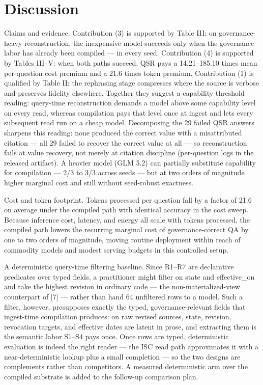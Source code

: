 \documentclass[conference,a4paper]{IEEEtran}
\begin{document}
\section{Discussion}

Claims and evidence. Contribution (3) is supported by Table III: on governance-heavy reconstruction, the inexpensive model succeeds only when the governance labor has already been compiled --- in every seed. Contribution (4) is supported by Tables III--V: when both paths succeed, QSR pays a 14.21--185.10 times mean per-question cost premium and a 21.6 times token premium. Contribution (1) is qualified by Table II: the rephrasing stage compresses where the source is verbose and preserves fidelity elsewhere. Together they suggest a capability-threshold reading: query-time reconstruction demands a model above some capability level on every read, whereas compilation pays that level once at ingest and lets every subsequent read run on a cheap model. Decomposing the 29 failed QSR answers sharpens this reading: none produced the correct value with a misattributed citation --- all 29 failed to recover the correct value at all --- so reconstruction fails at value recovery, not merely at citation discipline (per-question logs in the released artifact). A heavier model (GLM 5.2) can partially substitute capability for compilation --- 2/3 to 3/3 across seeds --- but at two orders of magnitude higher marginal cost and still without seed-robust exactness.

Cost and token footprint. Tokens processed per question fall by a factor of 21.6 on average under the compiled path with identical accuracy in the cost sweep. Because inference cost, latency, and energy all scale with tokens processed, the compiled path lowers the recurring marginal cost of governance-correct QA by one to two orders of magnitude, moving routine deployment within reach of commodity models and modest serving budgets in this controlled setup.

A deterministic query-time filtering baseline. Since R1--R7 are declarative predicates over typed fields, a practitioner might filter on state and effective\_on and take the highest revision in ordinary code --- the non-materialized-view counterpart of [7] --- rather than hand 64 unfiltered rows to a model. Such a filter, however, presupposes exactly the typed, governance-relevant fields that ingest-time compilation produces: on raw revised sources, state, revision, revocation targets, and effective dates are latent in prose, and extracting them is the semantic labor S1--S4 pays once. Once rows are typed, deterministic evaluation is indeed the right reader --- the ISC read path approximates it with a near-deterministic lookup plus a small completion --- so the two designs are complements rather than competitors. A measured deterministic arm over the compiled substrate is added to the follow-up comparison plan.
\end{document}
